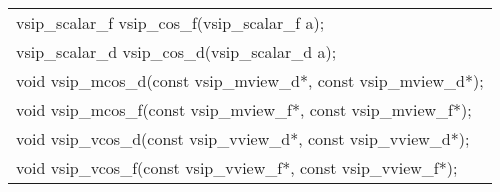\\\cvsiplh
\afh
\\\hspace*{.04\textwidth} {
\ttfamily
\begin{tabular}[H]{l}
vsip\_scalar\_f vsip\_cos\_f(vsip\_scalar\_f a);\\
vsip\_scalar\_d vsip\_cos\_d(vsip\_scalar\_d a);\\
void vsip\_mcos\_d(const vsip\_mview\_d*, const vsip\_mview\_d*);\\
void vsip\_mcos\_f(const vsip\_mview\_f*, const vsip\_mview\_f*);\\
void vsip\_vcos\_d(const vsip\_vview\_d*, const vsip\_vview\_d*);\\
void vsip\_vcos\_f(const vsip\_vview\_f*, const vsip\_vview\_f*);\\
\end{tabular}
}
\\\pyjvsiph
{}
